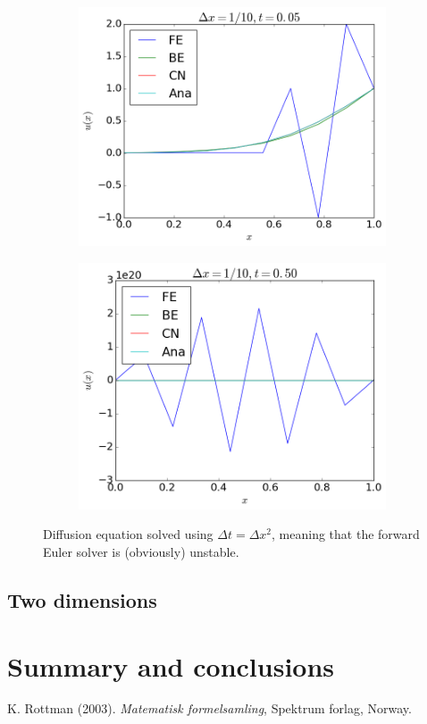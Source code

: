 \documentclass[12pt, a4paper]{article}
\begin{document}
\begin{figure}
	\centering 
 	\begin{subfigure}[b]{0.495\textwidth}
		\includegraphics[width=\textwidth]{../Programs/Output/Diffusion_1d_t1_u.png}
  	\end{subfigure}
  	\begin{subfigure}[b]{0.495\textwidth}
		\includegraphics[width=\textwidth]{../Programs/Output/Diffusion_1d_t2_u.png}
  	\end{subfigure}	
  	\caption{Diffusion equation solved using $\Delta t = \Delta x^2$, meaning that the forward Euler 
  	solver is (obviously) unstable.}
  	\label{fig:1d_unstable}
\end{figure}

\subsection{Two dimensions}

\section{Summary and conclusions}

\begin{thebibliography}{40}

 K. Rottman (2003). \textit{Matematisk formelsamling}, Spektrum forlag, Norway. 

\end{thebibliography}
\end{document}
